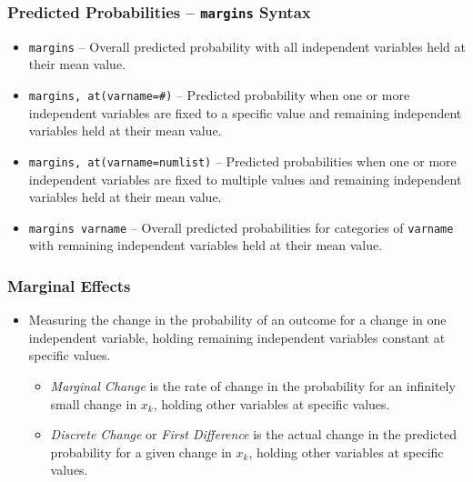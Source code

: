 \documentclass{beamer}
\begin{document}
\begin{frame}
	\frametitle{Predicted Probabilities -- \texttt{margins} Syntax}
	\begin{itemize}
		\item \texttt{margins} -- Overall predicted probability with all independent variables held at their mean value.
		\item \texttt{margins, at(varname=\#)} -- Predicted probability when one or more independent variables are fixed to a specific value and remaining independent variables held at their mean value.
		\item \texttt{margins, at(varname=numlist)} -- Predicted probabilities when one or more independent variables are fixed to multiple values and remaining independent variables held at their mean value.
		\item \texttt{margins varname} -- Overall predicted probabilities for categories of \texttt{varname} with remaining independent variables held at their mean value.
	\end{itemize}
\end{frame}

\begin{frame}
	\frametitle{Marginal Effects}
	\begin{itemize}
		\item Measuring the change in the probability of an outcome for a change in one independent variable, holding remaining independent variables constant at specific values.
		\begin{itemize}
			\item \textit{Marginal Change} is the rate of change in the probability for an infinitely small change in $x_{k}$, holding other variables at specific values.
			\item \textit{Discrete Change} or \textit{First Difference} is the actual change in the predicted probability for a given change in $x_{k}$, holding other variables at specific values.
		\end{itemize}
	\end{itemize}
\end{frame}
\end{document}
